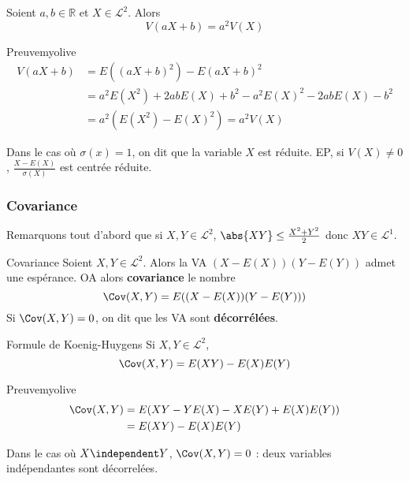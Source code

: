     \begin{prop}{}{}
        Soient $a,b \in \mathbb{R}$ et $X \in \mathcal{L}^2$. Alors 
        \[ V(aX + b) = a^2 V(X) \]   
    \end{prop}

    \begin{demo}{Preuve}{myolive}
        \begin{align*}
            V(aX + b) 
            &= E((aX + b)^2) - E(aX + b)^2 \\
            &= a^2 E(X^2) + 2 a b E(X) + b^2 - a^2 E(X)^2 - 2 a b E(X) - b^2 \\
            &= a^2 (E(X^2) - E(X)^2) = a^2 V(X)
        \end{align*}
    \end{demo}

    Dans le cas où $\sigma(x) = 1$, on dit que la variable $X$ est réduite. EP, si $V(X) \neq 0$, $\frac{X -E(X)}{\sigma(X)}$ est centrée réduite.

    \subsubsection{Covariance}

    Remarquons tout d’abord que si $X,Y \in \mathcal{L}^2$, $\abs{XY} \leq \frac{X^2 + Y^2}{2}$ donc $XY \in \mathcal{L}^1$. 

    \begin{defitheo}{Covariance}{}
        Soient $X,Y \in \mathcal{L}^2$. Alors la VA $(X-E(X))(Y - E(Y))$ admet une espérance. OA alors \textbf{covariance} le nombre 
        \[ \Cov(X,Y) = E((X- E(X))(Y - E(Y))) \]   
        Si $\Cov(X,Y) = 0$, on dit que les VA sont \textbf{décorrélées}.
    \end{defitheo}

    \begin{prop}{Formule de Koenig-Huygens}{}
        Si $X,Y \in \mathcal{L}^2$, 
        \[ \Cov(X,Y) = E(XY) - E(X)E(Y) \] 
    \end{prop}

    \begin{demo}{Preuve}{myolive}
        \begin{align*}
            \Cov(X,Y) 
            &= E(XY - YE(X) - XE(Y) + E(X) E(Y)) \\
            &= E(XY) - E(X)E(Y) 
        \end{align*}
    \end{demo}

    Dans le cas où $X \independent Y$, $\Cov(X,Y) = 0$ : deux variables indépendantes sont décorrelées.

